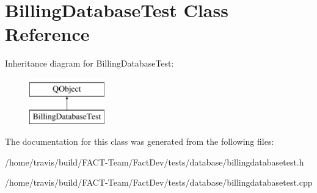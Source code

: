 \hypertarget{classBillingDatabaseTest}{\section{Billing\-Database\-Test Class Reference}
\label{classBillingDatabaseTest}
}
Inheritance diagram for Billing\-Database\-Test\-:\begin{figure}[H]
\begin{center}
\leavevmode
\includegraphics[height=2.000000cm]{d1/db1/classBillingDatabaseTest}
\end{center}
\end{figure}


The documentation for this class was generated from the following files\-:\begin{DoxyCompactItemize}
\item 
/home/travis/build/\-F\-A\-C\-T-\/\-Team/\-Fact\-Dev/tests/database/billingdatabasetest.\-h\item 
/home/travis/build/\-F\-A\-C\-T-\/\-Team/\-Fact\-Dev/tests/database/billingdatabasetest.\-cpp\end{DoxyCompactItemize}
